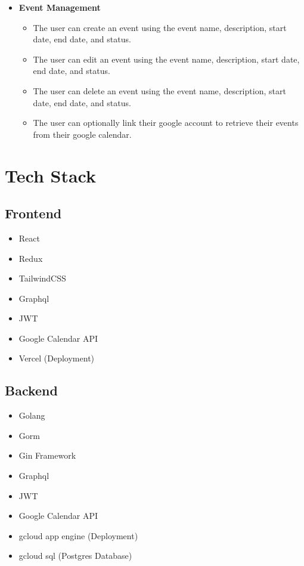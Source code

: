 \documentclass[10pt, a4paper]{article}
\begin{document}
\begin{itemize}
\begin{itemize}
            \end{itemize}
          \item
            \textbf{Event Management}
            \begin{itemize}
              \item
                The user can create an event using the event name, description, start date, end date, and status.
              \item
                The user can edit an event using the event name, description, start date, end date, and status.
              \item
                The user can delete an event using the event name, description, start date, end date, and status.
              \item 
                The user can optionally link their google account to retrieve their events from their google calendar.
            \end{itemize}
        \end{itemize}
    \section{Tech Stack}
      \subsection{Frontend}
        \begin{itemize}
          \item React
          \item Redux
          \item TailwindCSS
          \item Graphql
          \item JWT
          \item Google Calendar API
          \item Vercel (Deployment)
        \end{itemize}
      \subsection{Backend}
        \begin{itemize}
          \item Golang
          \item Gorm
          \item Gin Framework
          \item Graphql
          \item JWT
          \item Google Calendar API
          \item gcloud app engine (Deployment)
          \item gcloud sql (Postgres Database)
        \end{itemize}
\end{document}
